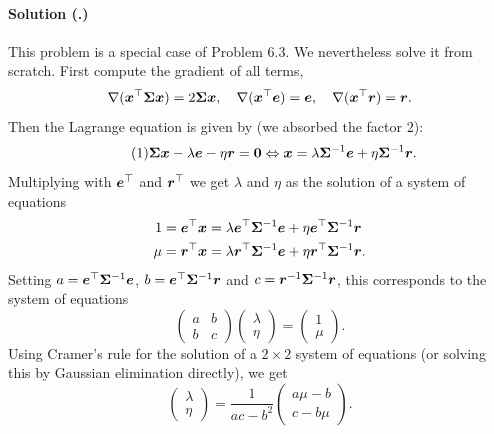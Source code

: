 \documentclass{article}
\newcounter{problemSheetNumber}
\newcounter{problems}
\renewcommand{\solution}[1]{\paragraph{Solution (\theproblemSheetNumber.\theproblems)}\addtocounter{problems}{1}\label{#1}}
\begin{document}
\solution{pr:2} 
This problem is a special case of Problem 6.3. We nevertheless solve it from scratch.
First compute the gradient of all terms,
\begin{equation*}
 \nabla (\bm{x}^{\top}\bm{\Sigma} \bm{x}) = 2\bm{\Sigma} \bm{x}, \quad \nabla (\bm{x}^{\top}\bm{e}) = \bm{e}, \quad \nabla (\bm{x}^{\top}\bm{r})=\bm{r}.
\end{equation*}
Then the Lagrange equation is given by (we absorbed the factor $2$):
\begin{equation}\label{eq:1}\tag{1}
 \bm{\Sigma} \bm{x}-\lambda \bm{e}-\eta \bm{r} = \bm{0} \Leftrightarrow \bm{x} = \lambda \bm{\Sigma}^{-1}\bm{e}+\eta\bm{\Sigma}^{-1}\bm{r}.
\end{equation}
Multiplying with $\bm{e}^{\top}$ and $\bm{r}^{\top}$ we get $\lambda$ and $\eta$ as the solution of a system of equations
\begin{align*}
 1 = \bm{e}^{\top}\bm{x} &= \lambda \bm{e}^{\top}\bm{\Sigma}^{-1}\bm{e}+ \eta \bm{e}^{\top}\bm{\Sigma}^{-1}\bm{r}\\
 \mu = \bm{r}^{\top}\bm{x} &= \lambda \bm{r}^{\top}\bm{\Sigma}^{-1}\bm{e}+ \eta \bm{r}^{\top}\bm{\Sigma}^{-1}\bm{r}.
\end{align*}
Setting $a=\bm{e}^{\top}\bm{\Sigma}^{-1}\bm{e}$, $b=\bm{e}^{\top}\bm{\Sigma}^{-1}\bm{r}$ and $c=\bm{r}^{-1}\bm{\Sigma}^{-1}\bm{r}$, this corresponds to the system of equations
\begin{equation*}
 \begin{pmatrix} a & b\\ b& c\end{pmatrix} \begin{pmatrix} \lambda \\ \eta\end{pmatrix} = \begin{pmatrix} 1\\ \mu\end{pmatrix}.
\end{equation*}
Using Cramer's rule for the solution of a $2\times 2$ system of equations (or solving this by Gaussian elimination directly), we get
\begin{equation*}
 \begin{pmatrix} \lambda\\ \eta\end{pmatrix} = \frac{1}{ac-b^2} \begin{pmatrix} a\mu-b\\c-b\mu \end{pmatrix}.
\end{equation*}
\end{document}
